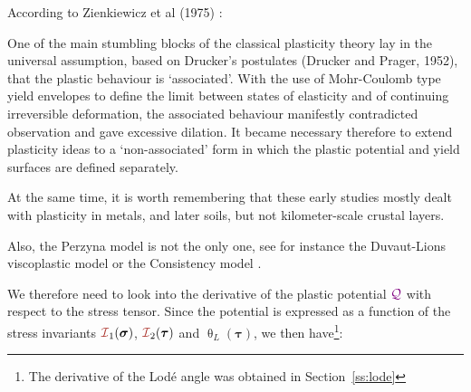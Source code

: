 According to Zienkiewicz et al (1975) \cite{zihl75}:
\begin{displayquote}
{\color{darkgray}
One of the main stumbling blocks of the 
classical plasticity theory lay in the universal
assumption, based on Drucker's postulates (Drucker and Prager, 1952), that the plastic 
behaviour is `associated'. With the use of Mohr-Coulomb type yield envelopes to define the
limit between states of elasticity and of continuing irreversible deformation,
the associated behaviour manifestly contradicted observation and gave excessive dilation.
It became necessary therefore to extend plasticity ideas to a `non-associated'
form in which the plastic potential and yield surfaces are defined separately.}
\end{displayquote}
At the same time, it is worth remembering that these early studies mostly dealt
with plasticity in metals, and later soils, but not kilometer-scale crustal layers.

Also, the Perzyna model is not the only one, see for instance
the Duvaut-Lions viscoplastic model or the Consistency model \cite{wasd97,hesd02}.

We therefore need to look into the derivative of the plastic potential ${{\color{violet}\cal Q}}$
with respect to the stress tensor. Since the potential 
is expressed as a function of the stress invariants ${\III}_1(\bm\sigma)$,
${\III}_2(\bm\tau)$ and $\uptheta_L(\bm\tau)$, we then have\footnote{
The derivative of the Lod\'e angle was obtained in Section~\ref{ss:lode}}:

